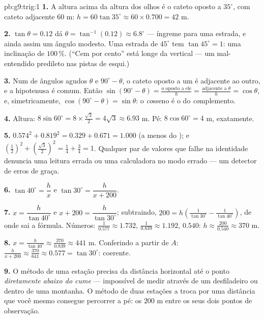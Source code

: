 \begin{solution}{pb:g9:trig:1}
\textbf{1.} A altura acima da altura dos olhos é o cateto oposto a
$35^\circ$, com cateto adjacente $60$ m:
$h = 60 \tan 35^\circ \approx 60 \times 0.700 = 42$ m.

\textbf{2.} $\tan\theta = 0.12$ dá
$\theta = \tan^{-1}(0.12) \approx 6.8^\circ$ --- íngreme para uma
estrada, e ainda assim um ângulo modesto. Uma estrada de $45^\circ$ tem
$\tan 45^\circ = 1$: uma inclinação de $100\,\%$. (``Cem por cento''
está longe da vertical --- um mal-entendido predileto nas pistas de
esqui.)

\textbf{3.} Num  de ângulos agudos $\theta$ e
$90^\circ - \theta$, o cateto oposto a um é adjacente ao outro, e a
hipotenusa é comum. Então
$\sin(90^\circ - \theta) = \frac{\text{o oposto a ele}}{h} =
\frac{\text{adjacente a }\theta}{h} = \cos\theta$, e, simetricamente,
$\cos(90^\circ - \theta) = \sin\theta$: o \emph{co}sseno é o  do
\emph{co}mplemento.

\textbf{4.} Altura: $8 \sin 60^\circ = 8 \times \frac{\sqrt3}{2} =
4\sqrt3 \approx 6.93$ m. Pé: $8 \cos 60^\circ = 4$ m, exatamente.

\textbf{5.} $0.574^2 + 0.819^2 = 0.329 + 0.671 = 1.000$ (a menos do
); e $\left(\frac12\right)^2 +
\left(\frac{\sqrt3}{2}\right)^2 = \frac14 + \frac34 = 1$. Qualquer par
de valores que falhe na identidade denuncia uma leitura errada ou uma
calculadora no modo errado --- um detector de erros de graça.

\textbf{6.} $\tan 40^\circ = \dfrac hx$ e
$\tan 30^\circ = \dfrac{h}{x + 200}$.

\textbf{7.} $x = \dfrac{h}{\tan 40^\circ}$ e
$x + 200 = \dfrac{h}{\tan 30^\circ}$; subtraindo,
$200 = h\left(\frac{1}{\tan 30^\circ} -
\frac{1}{\tan 40^\circ}\right)$, de onde sai a fórmula. Números:
$\frac{1}{0.577} \approx 1.732$, $\frac{1}{0.839} \approx 1.192$,
 $0.540$: $h \approx \frac{200}{0.540} \approx 370$ m.

\textbf{8.} $x = \frac{h}{\tan 40^\circ} \approx \frac{370}{0.839}
\approx 441$ m. Conferindo a partir de $A$:
$\frac{h}{x + 200} \approx \frac{370}{641} \approx 0.577 =
\tan 30^\circ$: coerente.

\textbf{9.} O método de uma estação precisa da distância horizontal até
o ponto \emph{diretamente abaixo do cume} --- impossível de medir
através de um desfiladeiro ou dentro de uma montanha. O método de duas
estações a troca por uma distância que você mesmo consegue percorrer a
pé: os $200$ m entre os seus dois pontos de observação.


\end{solution}
